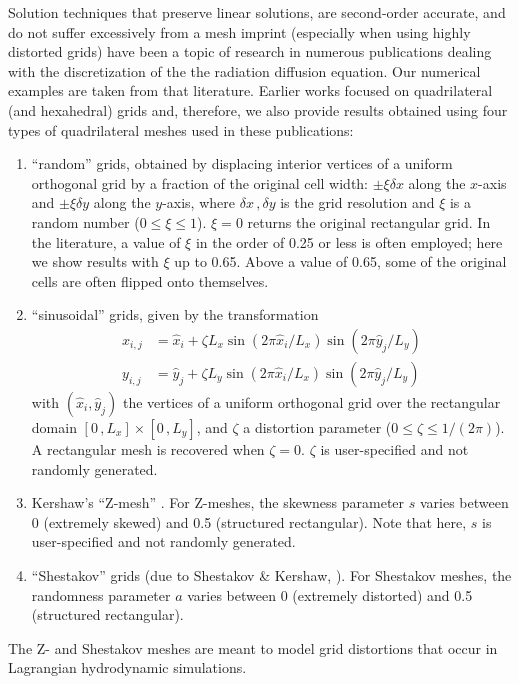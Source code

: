 \documentclass[preprint,10pt]{elsarticle}
\begin{document}
Solution techniques that preserve linear solutions, are 
second-order accurate, and do not suffer excessively from a mesh imprint (especially when using highly
distorted grids) have been a topic of research in numerous publications dealing with the discretization of the
the radiation diffusion equation. Our numerical examples
are taken from that literature. Earlier works focused on quadrilateral (and hexahedral) grids
\cite{Morel1992,MorelRobertsShashkov1998,MorelHallShashkov2001,Palmer2001} and, therefore, 
we also provide results obtained using four types of quadrilateral meshes used in these publications: 
\begin{enumerate}
\item 
``random'' grids, obtained by displacing interior vertices of a uniform orthogonal grid by a fraction
of the original cell width: $\pm\xi\delta x$ along 
the $x$-axis and $\pm\xi\delta y$ along the $y$-axis, where $\delta x\,,\delta y$ is the grid resolution 
and $\xi$ is a random number ($0 \le \xi \le 1$). $\xi=0$ returns the original rectangular grid. In 
the literature, a value of $\xi$ in the order of 0.25 or less is often employed; here we show results with $\xi$ up to 0.65. 
Above a value of 0.65, some of the original cells are often flipped onto themselves. 
\item
 ``sinusoidal'' grids, given by the transformation
\begin{align*}
x_{i,j} &= \hat x_i + \zeta L_x \sin\left(2\pi \hat x_i/L_x \right) \sin\left(2\pi \hat y_j/L_y \right) \\
y_{i,j} &= \hat y_j + \zeta L_y \sin\left(2\pi \hat x_i/L_x \right) \sin\left(2\pi \hat y_j/L_y \right) 
\end{align*}
with $(\hat x_i, \hat y_j)$ the vertices of a uniform orthogonal grid over the rectangular domain 
$[0\, , L_x]\times [0\, , L_y]$, and $\zeta$ a distortion parameter ($0\le \zeta \le 1/(2\pi)$). 
A rectangular mesh is recovered when $\zeta=0$. $\zeta$ is user-specified and not randomly generated.
\item
Kershaw's ``Z-mesh'' \cite{Kershaw1981}.  
For Z-meshes, the skewness parameter $s$ varies between 0 (extremely skewed) and 0.5 (structured rectangular).
Note that here, $s$ is user-specified and not randomly generated.
\item 
``Shestakov'' grids (due to Shestakov \& Kershaw, \cite{Shestakov1988,Sheshakov1990}).
For Shestakov meshes, the randomness parameter $a$ varies between 0 (extremely distorted) 
and 0.5 (structured rectangular).
\end{enumerate}
The Z- and Shestakov meshes are meant to model grid distortions that occur in Lagrangian hydrodynamic 
simulations. 
\end{document}
